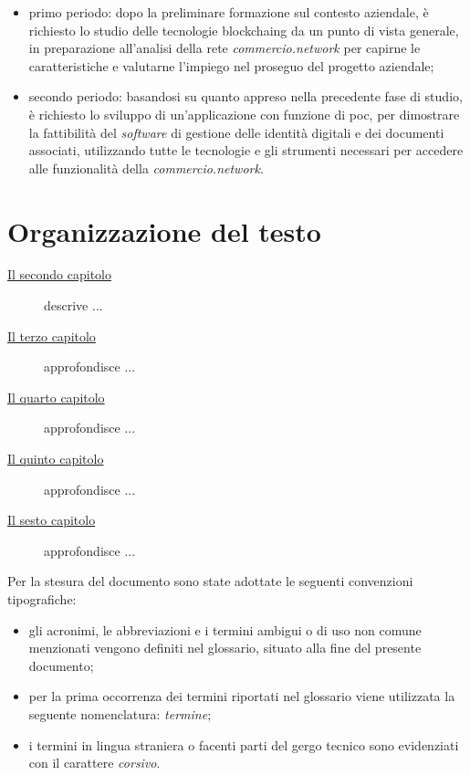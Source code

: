 \begin{itemize}
	\item primo periodo: dopo la preliminare formazione sul contesto aziendale, è richiesto lo studio delle tecnologie \gls{blockchaing} da un punto di vista generale, in preparazione all'analisi della rete \textit{commercio.network} per capirne le caratteristiche e valutarne l'impiego nel proseguo del progetto aziendale;
	\item secondo periodo: basandosi su quanto appreso nella precedente fase di studio, è richiesto lo sviluppo di un'applicazione con funzione di \gls{poc}\glsfirstoccur{}, per dimostrare la fattibilità del \textit{software} di gestione delle identità digitali e dei documenti associati, utilizzando tutte le tecnologie e gli strumenti necessari per accedere alle funzionalità della \textit{commercio.network}. 
 \end{itemize}

\section{Organizzazione del testo}

\begin{description}
    \item[{\hyperref[cap:stage]{Il secondo capitolo}}] descrive ...
    
    \item[{\hyperref[cap:blockchain]{Il terzo capitolo}}] approfondisce ...
    
    \item[{\hyperref[cap:tecnologie-strumenti]{Il quarto capitolo}}] approfondisce ...
    
    \item[{\hyperref[cap:applicazione]{Il quinto capitolo}}] approfondisce ...
    
    \item[{\hyperref[cap:conclusioni]{Il sesto capitolo}}] approfondisce ...
\end{description}

Per la stesura del documento sono state adottate le seguenti convenzioni tipografiche:

\begin{itemize}
	\item gli acronimi, le abbreviazioni e i termini ambigui o di uso non comune menzionati vengono definiti nel glossario, situato alla fine del presente documento;
	\item per la prima occorrenza dei termini riportati nel glossario viene utilizzata la seguente nomenclatura: \emph{termine}\glsfirstoccur;
	\item i termini in lingua straniera o facenti parti del gergo tecnico sono evidenziati con il carattere \emph{corsivo}.
\end{itemize}
